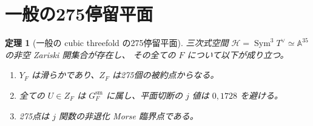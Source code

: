 \documentclass[11pt,a4paper]{ltjsarticle}
\newtheorem{theorem}{定理}[section]
\newcommand{\Sym}{\operatorname{Sym}}
\newcommand{\cH}{\mathcal H}
\begin{document}
\section{一般の275停留平面}
\begin{theorem}[一般の cubic threefold の275停留平面]\label{thm:275}
三次式空間 $\cH=\Sym^3T^\vee\simeq\mathbb A^{35}$ の非空 Zariski 開集合が存在し、
その全ての $F$ について以下が成り立つ。
\begin{enumerate}
\item $Y_F$ は滑らかであり、$Z_F$ は275個の被約点からなる。
\item 全ての $U\in Z_F$ は $G_F^{\mathrm{sm}}$ に属し、平面切断の $j$ 値は $0,1728$ を避ける。
\item 275点は $j$ 関数の非退化 Morse 臨界点である。
\end{enumerate}
\end{theorem}
\end{document}
